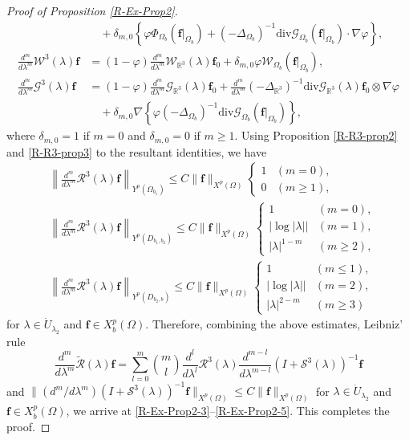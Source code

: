\documentclass[10pt,a4paper]{amsart}
\begin{document}
\begin{proof}[Proof of Proposition \ref{R-Ex-Prop2}]
\begin{align*}
&\quad +\delta_{m,0}\left\{\varphi\Phi_{\Omega_{b}}(\mathbf{f}|_{\Omega_{b}})+(-\Delta_{\Omega_b})^{-1}\mathrm{div}\mathcal{G}_{\Omega_b}(\mathbf{f}|_{\Omega_{b}})\cdot\nabla\varphi\right\}, \\
\frac{d^m}{d\lambda^m}\mathcal{W}^3(\lambda)\mathbf{f}&=(1-\varphi)\frac{d^m}{d\lambda^m} \mathcal{W}_{\mathbb{R}^3}(\lambda)\mathbf{f}_0+\delta_{m,0}\varphi\mathcal{W}_{\Omega_{b}}(\mathbf{f}|_{\Omega_{b}}), \\
\frac{d^m}{d\lambda^m}\mathcal{G}^3(\lambda)\mathbf{f}&=(1-\varphi)\frac{d^m}{d\lambda^m} \mathcal{G}_{\mathbb{R}^3}(\lambda)\mathbf{f}_0+ \frac{d^m}{d\lambda^m}(-\Delta_{\mathbb{R}^3})^{-1}\mathrm{div}\mathcal{G}_{\mathbb{R}^3}(\lambda)\mathbf{f}_0\otimes\nabla\varphi \\
&\quad + \delta_{m,0}\nabla\left\{\varphi(-\Delta_{\Omega_b})^{-1}\mathrm{div}\mathcal{G}_{\Omega_{b}}(\mathbf{f}|_{\Omega_{b}})\right\},
\end{align*}
where $\delta_{m,0}=1$ if $m=0$ and $\delta_{m,0}=0$ if $m\ge1$.
Using Proposition \ref{R-R3-prop2} and \ref{R-R3-prop3} to the resultant identities, we have
\begin{align*}
&\left\|\frac{d^m}{d\lambda^m}\mathcal{R}^3(\lambda)\mathbf{f}\right\|_{Y^p(\Omega_{b_1} )} 
\le C\|\mathbf{f}\|_{X^p(\Omega)}
\begin{cases}
1 & (m=0), \\
0 & (m\ge1),
\end{cases} \\
&\left\|\frac{d^m}{d\lambda^m}\mathcal{R}^3(\lambda)\mathbf{f}\right\|_{Y^p(D_{b_1,b_2})} 
\le C\|\mathbf{f}\|_{X^p(\Omega)}
\begin{cases}
1 & (m=0), \\
\left|\log |\lambda|\right| & (m=1), \\
|\lambda|^{1-m} &(m\ge2),
\end{cases} \\
&\left\|\frac{d^m}{d\lambda^m}\mathcal{R}^3(\lambda)\mathbf{f}\right\|_{Y^p( D_{b_2,b})} 
\le C\|\mathbf{f}\|_{X^p(\Omega)}
\begin{cases}
1 & (m\le 1), \\
\left|\log |\lambda|\right| & (m=2), \\
|\lambda|^{2-m} &(m\ge3)
\end{cases}
\end{align*}
for $\lambda\in \Dot{U}_{\lambda_2}$ and $\mathbf{f}\in X_b^p(\Omega)$.
Therefore, combining the above estimates, Leibniz' rule 
\[
\frac{d^m}{d\lambda^m}\widetilde{\mathcal{R}}(\lambda)\mathbf{f}=\sum_{l=0}^m \binom{m}{l} \frac{d^l}{d\lambda^l}\mathcal{R}^3(\lambda)\frac{d^{m-l}}{d\lambda^{m-l}}(I+\mathcal{S}^3(\lambda))^{-1}\mathbf{f}
\]
and $\|(d^m/d\lambda^m)(I+\mathcal{S}^3(\lambda))^{-1}\mathbf{f}\|_{X^p(\Omega)}\le C\|\mathbf{f}\|_{X^p(\Omega)}$ for $\lambda\in \Dot{U}_{\lambda_2}$ and $\mathbf{f}\in X_b^p(\Omega)$, we arrive at \eqref{R-Ex-Prop2-3}--\eqref{R-Ex-Prop2-5}.
This completes the proof.
\end{proof}
\end{document}

